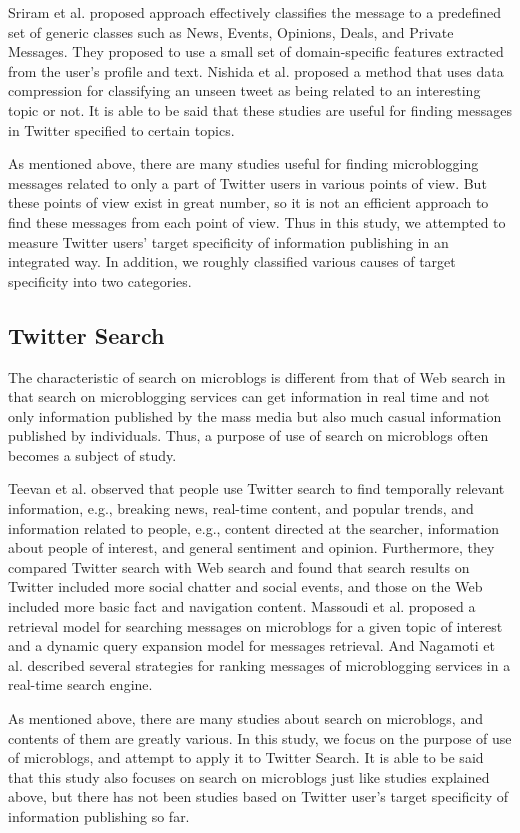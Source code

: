 Sriram et al.\cite{sriram2010short} proposed approach effectively
classifies the message to a predefined set of generic classes such as
News, Events, Opinions, Deals, and Private Messages.  They proposed to
use a small set of domain-specific features extracted from the user's
profile and text.  Nishida et al.\cite{nishida2011tweet} proposed a
method that uses data compression for classifying an unseen tweet as
being related to an interesting topic or not.  It is able to be
said that these studies are useful for finding messages in Twitter
specified to certain topics.

As mentioned above, there are many studies useful for finding microblogging
messages related to only a part of Twitter users in various points of
view.  But these points of view exist in great number, so it is not an
efficient approach to find these messages from each point of view.
Thus in this study, we attempted to measure Twitter users' target
specificity of information publishing in an integrated way.  In
addition, we roughly classified various causes of target specificity
into two categories.

\subsection{Twitter Search}
\label{subsec:Twitter Search}

The characteristic of search on microblogs is different
from that of Web search\cite{broder2002taxonomy} in that search on
microblogging services can get information in real
time\cite{busch2012earlybird} and not only information published by the
mass media but also much casual information published by
individuals\cite{java2007we}.  Thus, a purpose of use of search on
microblogs often becomes a subject of study.

Teevan et al.\cite{teevan2011twittersearch} observed that people use
Twitter search to find temporally relevant information, e.g., breaking
news, real-time content, and popular trends, and information related to
people, e.g., content directed at the searcher, information about
people of interest, and general sentiment and opinion.  Furthermore,
they compared Twitter search with Web search and found that search
results on Twitter included more social chatter and social events, and
those on the Web included more basic fact and navigation content.
Massoudi et al.\cite{massoudi2011incorporating} proposed a retrieval
model for searching messages on microblogs for a given topic
of interest and a dynamic query expansion model for messages retrieval.
And Nagamoti et al.\cite{nagmoti2010ranking} described several
strategies for ranking messages of microblogging services in a
real-time search engine.

As mentioned above, there are many studies about search on microblogs,
and contents of them are greatly various.  In this study, we
focus on the purpose of use of microblogs, and attempt to
apply it to Twitter Search.  It is able to be said that this study also
focuses on search on microblogs just like studies explained
above, but there has not been studies based on Twitter user's target specificity
of information publishing so far.